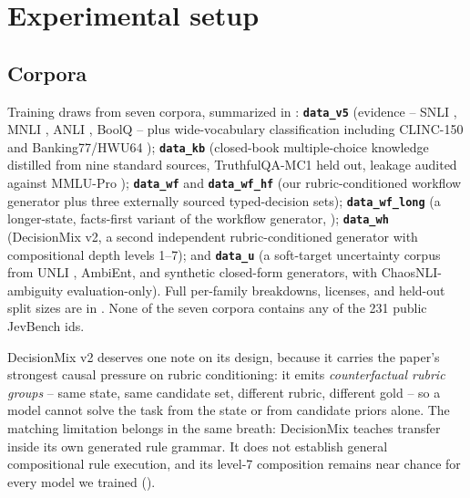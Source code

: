 \section{Experimental setup}
\label{sec:experiments}

\subsection{Corpora}
\label{sec:experiments:data}

Training draws from seven corpora, summarized in : \textbf{\texttt{data\_v5}} (evidence
-- SNLI \citep{bowman2015snli}, MNLI \citep{williams2018mnli}, ANLI \citep{nie2020anli}, BoolQ
\citep{clark2019boolq} -- plus wide-vocabulary classification including CLINC-150 and Banking77/HWU64
\citep{larson2019clinc,casanueva2020banking77}); \textbf{\texttt{data\_kb}} (closed-book multiple-choice
knowledge distilled from nine standard sources, TruthfulQA-MC1 \citep{lin2022truthfulqa} held out, leakage
audited against MMLU-Pro \citep{wang2024mmlupro,hendrycks2021mmlu}); \textbf{\texttt{data\_wf}} and
\textbf{\texttt{data\_wf\_hf}} (our rubric-conditioned workflow generator plus three externally sourced
typed-decision sets); \textbf{\texttt{data\_wf\_long}} (a longer-state, facts-first variant of the
workflow generator, ); \textbf{\texttt{data\_wh}} (DecisionMix v2, a second
independent rubric-conditioned generator with compositional depth levels 1--7); and
\textbf{\texttt{data\_u}} (a soft-target uncertainty corpus from UNLI \citep{chen2020unli}, AmbiEnt, and
synthetic closed-form generators, with ChaosNLI-ambiguity \citep{nie2020chaosnli} evaluation-only).
Full per-family breakdowns, licenses, and held-out split sizes are in . None of the
seven corpora contains any of the 231 public JevBench ids.

DecisionMix v2 deserves one note on its design, because it carries the paper's strongest causal pressure
on rubric conditioning: it emits \emph{counterfactual rubric groups} -- same state, same candidate set,
different rubric, different gold -- so a model cannot solve the task from the state or from candidate
priors alone. The matching limitation belongs in the same breath: DecisionMix teaches transfer inside its
own generated rule grammar. It does not establish general compositional rule execution, and its level-7
composition remains near chance for every model we trained ().

